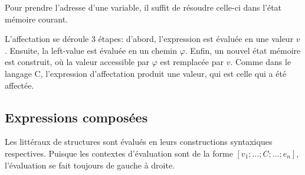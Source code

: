 Pour prendre l'adresse d'une variable, il suffit de résoudre celle-ci dans
l'état mémoire courant.

\begin{mathpar}
\end{mathpar}

L'affectation se déroule 3 étapes: d'abord, l'expression est évaluée en une
valeur $v$. Ensuite, la left-value est évaluée en un chemin $φ$. Enfin, un
nouvel état mémoire est construit, où la valeur accessible par $φ$ est remplacée
par $v$. Comme dans le langage C, l'expression d'affectation produit une valeur,
qui est celle qui a été affectée.

\begin{mathpar}
\end{mathpar}

\subsection*{Expressions composées}

Les littéraux de structures sont évalués en leurs constructions syntaxiques
respectives. Puisque les contextes d'évaluation sont de la forme $ [ v_1 ; … ; C
; … ; e_n ] $, l'évaluation se fait toujours de gauche à droite.

\begin{mathpar}

\end{mathpar}








